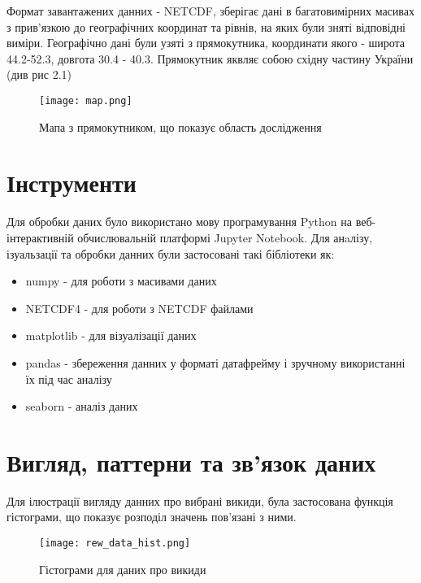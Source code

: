 Формат завантажених данних - NETCDF, зберігає дані в багатовимірних масивах з прив'язкою до географічних координат та рівнів, на яких були зняті відповідні виміри. 
Географічно дані були узяті з прямокутника, координати якого - широта 44.2-52.3, довгота 30.4 - 40.3. Прямокутник яквляє собою східну частину України (див рис 2.1)


\begin{center}
    \begin{figure}[h]
        \texttt{[image: map.png]}
        \caption{Мапа з прямокутником, що показує область дослідження}
    \end{figure}
\end{center}




\section{Інструменти}

Для обробки даних було використано мову програмування Python на веб-інтерактивній обчислювальній платформі Jupyter Notebook. 
Для анaлізу, ізуальзації та обробки данних були застосовані такі бібліотеки як: 

\begin{itemize}
    \item numpy - для роботи з масивами даних
    \item NETCDF4 - для роботи з NETCDF файлами
    \item matplotlib - для візуалізації даних
    \item pandas - збереження данних у форматі датафрейму і зручному використанні їх під час аналізу
    \item seaborn - аналіз даних
\end{itemize}

\section{Вигляд, паттерни та зв'язок даних}


Для ілюстрації вигляду данних про вибрані викиди, була застосована функція гістограми, що показує розподіл значень пов'язані з ними. 

\begin{center}
    \begin{figure}[h]
        \texttt{[image: rew\_data\_hist.png]}
        \caption{Гістограми для даних про викиди}
    \end{figure}
\end{center}

